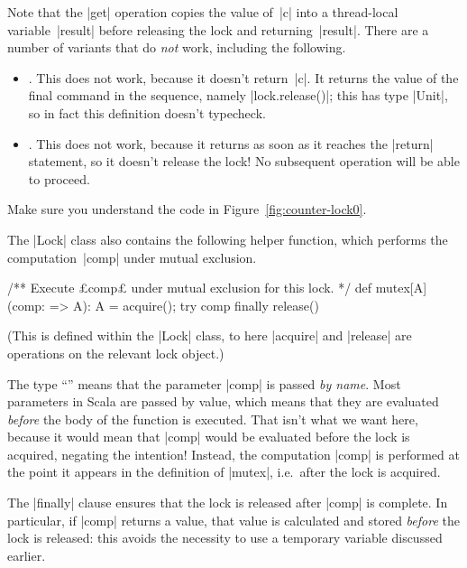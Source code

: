 
Note that the |get| operation copies the value of~|c| into a thread-local
variable~|result| before releasing the lock and returning~|result|.  There are
a number of variants that do \emph{not} work, including the following.
\begin{itemize}
\item {}.  This
  does not work, because it doesn't return~|c|.  It returns the value of the
  final command in the sequence, namely |lock.release()|; this has type
  |Unit|, so in fact this definition doesn't typecheck.

\item {}.
  This does not work, because it returns as soon as it reaches the |return|
  statement, so it doesn't release the lock!  No subsequent operation will be
  able to proceed.
\end{itemize}

\begin{instruction}
Make sure you understand the code in Figure~\ref{fig:counter-lock0}.
\end{instruction}


The |Lock| class also contains the following helper function, which performs
the computation~|comp| under mutual exclusion.
\begin{scala}
  /** Execute £comp£ under mutual exclusion for this lock. */
  def mutex[A](comp: => A): A = {
    acquire(); try{ comp } finally{ release() }
  } 
\end{scala}
%
(This is defined within the |Lock| class, to here |acquire| and |release| are
operations on the relevant lock object.)

The type ``'' means that the parameter |comp| is passed \emph{by
  name}.  Most parameters in Scala are passed by value, which means
that they are evaluated \emph{before} the body of the function is executed.
That isn't what we want here, because it would mean that |comp| would be
evaluated before the lock is acquired, negating the intention!  Instead, the
computation |comp| is performed at the point it appears in the definition of
|mutex|, i.e.~after the lock is acquired.

The |finally| clause ensures that the lock is released after |comp| is
complete.  In particular, if |comp| returns a value, that value is calculated
and stored \emph{before} the lock is released: this avoids the necessity to
use a temporary variable discussed earlier.

